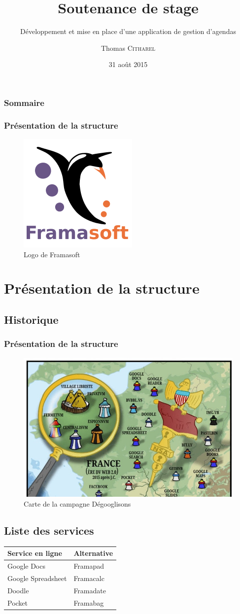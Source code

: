 \documentclass[12pt]{beamer}
\author{Thomas \textsc{Citharel}}
\title{Soutenance de stage}
\subtitle{Développement et mise en place d'une application de gestion d'agendas}
\institute{IUT d'Orléans}
\date{31 août 2015}
\begin{document}
	\maketitle
	
	\begin{frame}
		\frametitle{Sommaire}
		\tableofcontents
	\end{frame}
	\begin{frame}
		\frametitle{Présentation de la structure}
		\begin{figure}
		\centering
		\includegraphics[width=0.2\linewidth]{images/Framasoft-Logo}
		\caption{Logo de Framasoft}
		\label{fig:framasoft-logo}
		\end{figure}

		\section{Présentation de la structure}
		\subsection{Historique}
	\end{frame}
	\begin{frame}
		\frametitle{Présentation de la structure}
		\begin{figure}
			\centering
			\includegraphics[width=0.3\linewidth]{images/degooglisons-internet}
			\caption{Carte de la campagne Dégooglisons}
			\label{fig:degooglisons-carte}
		\end{figure}
		
		\subsection{Liste des services}
		
		\centering
		\begin{tabular}{|l|l|}
			\hline
			Service en ligne & Alternative \\
			\hline
			Google Docs & Framapad \\
			\hline
			Google Spreadsheet & Framacalc \\
			\hline
			Doodle & Framadate \\
			\hline
			Pocket & Framabag \\
			\hline
		\end{tabular}
	\end{frame}
\end{document}
